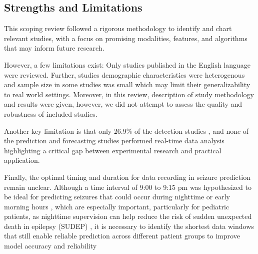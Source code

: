 \subsection{Strengths and Limitations}
This scoping review followed a rigorous methodology to identify and chart relevant studies, with a focus on promising modalities, features, and algorithms that may inform future research.

However, a few limitations exist: Only studies published in the English language were reviewed. Further, studies demographic characteristics were heterogenous and sample size in some studies was small which may limit their generalizability to real world settings. Moreover, in this review, description of study methodology and results were given, however, we did not attempt to assess the quality and robustness of included studies. 

Another key limitation is that only 26.9\% of the detection studies \cite{De_Cooman2018-pq,Chowdhury2022-bi,Ali2020-ke,Wang2025-ql,Hegarty-Craver2021-hk,Arends2018-ew,Jiang2022-zu}, and none of the prediction and forecasting studies performed real-time data analysis highlighting a critical gap between experimental research and practical application. 

Finally, the optimal timing and duration for data recording in seizure prediction remain unclear. Although a time interval of 9:00 to 9:15 pm was hypothesized to be ideal for predicting seizures that could occur during nighttime or early morning hours \cite{Vieluf2023-zv}, which are especially important, particularly for pediatric patients, as nighttime supervision can help reduce the risk of sudden unexpected death in epilepsy (SUDEP) \cite{Trivisano2022-zw}, it is necessary to identify the shortest data windows that still enable reliable prediction across different patient groups to improve model accuracy and reliability
